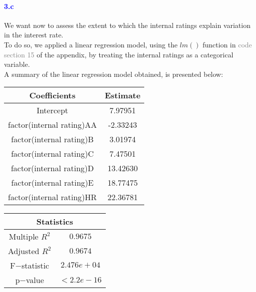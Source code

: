 \documentclass[a4paper,12pt]{article}
\begin{document}
\paragraph{\textcolor{Blue}{3.c}} We want now to assess the extent to which the internal ratings explain variation in the interest rate.\\
To do so, we applied a linear regression model, using the $lm()$ function in \textcolor{gray}{code section 15} of the appendix, by treating the internal ratings as a categorical variable.\\
A summary of the linear regression model obtained, is presented below:
\begin{table}[H]
    \begin{minipage}{0.5\textwidth}
        \centering
        \begin{tabular}{|c|c|}
        \hline
        \textbf{Coefficients} & \textbf{Estimate} \\
        \hline
        Intercept & 7.97951 \\
        \hline
        factor(internal rating)AA & -2.33243 \\
        \hline
        factor(internal rating)B & 3.01974 \\
        \hline
        factor(internal rating)C & 7.47501 \\
        \hline
        factor(internal rating)D & 13.42630 \\
        \hline
        factor(internal rating)E & 18.77475 \\
        \hline
        factor(internal rating)HR & 22.36781 \\
        \hline
        \end{tabular}
    \end{minipage}
    \begin{minipage}{0.5\textwidth}
        \centering
        \begin{tabular}{|c|c|}
            \hline
            \multicolumn{2}{|c|}{\textbf{Statistics}} \\
            \hline
            Multiple $R^2$ & $0.9675$ \\
            \hline
            Adjusted $R^2$ & $0.9674$ \\
            \hline
            F$-$statistic & $2.476e+04$ \\
            \hline
            p$-$value & $< 2.2e-16$ \\
            \hline
        \end{tabular}
    \end{minipage}
\end{table}
\end{document}
